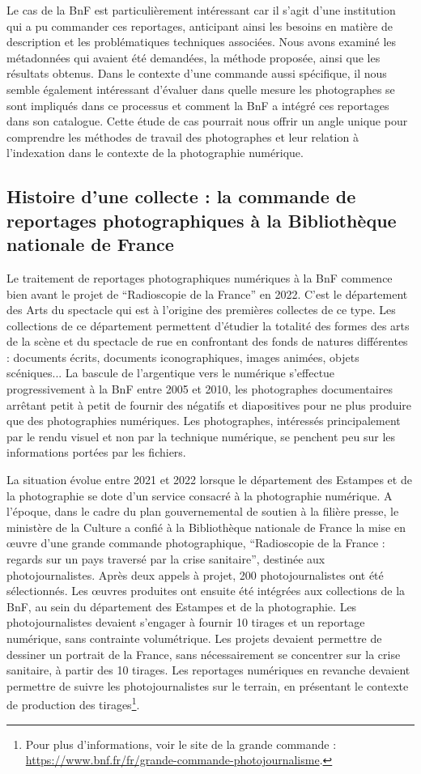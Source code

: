 Le cas de la BnF est particulièrement intéressant car il s’agit d’une institution qui a pu commander ces reportages, anticipant ainsi les besoins en matière de description et les problématiques techniques associées. Nous avons examiné les métadonnées qui avaient été demandées, la méthode proposée, ainsi que les résultats obtenus. Dans le contexte d'une commande aussi spécifique, il nous semble également intéressant d'évaluer dans quelle mesure les photographes se sont impliqués dans ce processus et comment la BnF a intégré ces reportages dans son catalogue. Cette étude de cas pourrait nous offrir un angle unique pour comprendre les méthodes de travail des photographes et leur relation à l’indexation dans le contexte de la photographie numérique.

\subsection*{Histoire d'une collecte : la commande de reportages photographiques à la Bibliothèque nationale de France}
Le traitement de reportages photographiques numériques à la BnF commence bien avant le projet de \enquote{Radioscopie de la France} en 2022. C'est le département des Arts du spectacle qui est à l'origine des premières collectes de ce type. Les collections de ce département permettent d'étudier la totalité des formes des arts de la scène et du spectacle de rue en confrontant des fonds de natures différentes : documents écrits, documents iconographiques, images animées, objets scéniques... La bascule de l'argentique vers le numérique s'effectue progressivement à la BnF entre 2005 et 2010, les photographes documentaires arrêtant petit à petit de fournir des négatifs et diapositives pour ne plus produire que des photographies numériques. Les photographes, intéressés principalement par le rendu visuel et non par la technique numérique, se penchent peu sur les informations portées par les fichiers. 

La situation évolue entre 2021 et 2022 lorsque le département des Estampes et de la photographie se dote d’un service consacré à la photographie numérique. A l'époque, dans le cadre du plan gouvernemental de soutien à la filière presse, le ministère de la Culture a confié à la Bibliothèque nationale de France la mise en œuvre d’une grande commande photographique, \enquote{Radioscopie de la France : regards sur un pays traversé par la crise sanitaire}, destinée aux photojournalistes. Après deux appels à projet, 200 photojournalistes ont été sélectionnés. Les \oe{}uvres produites ont ensuite été intégrées aux collections de la BnF, au sein du département des Estampes et de la photographie. Les photojournalistes devaient s'engager à fournir 10 tirages et un reportage numérique, sans contrainte volumétrique. Les projets devaient permettre de dessiner un portrait de la France, sans nécessairement se concentrer sur la crise sanitaire, à partir des 10 tirages. Les reportages numériques en revanche devaient permettre de suivre les photojournalistes sur le terrain, en présentant le contexte de production des tirages\footnote{Pour plus d'informations, voir le site de la grande commande : \url{https://www.bnf.fr/fr/grande-commande-photojournalisme}.}.

